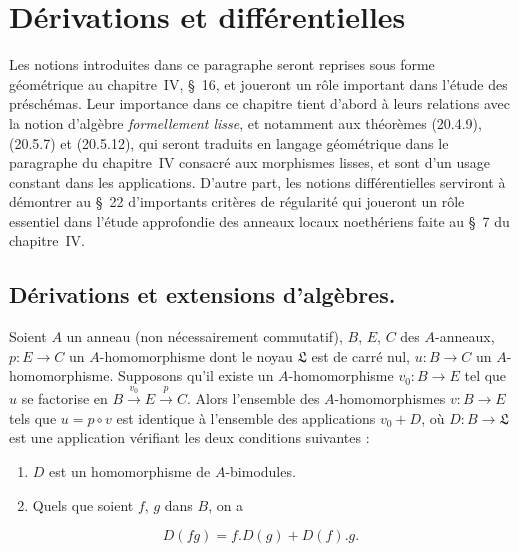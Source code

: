\section{Dérivations et différentielles}
\label{section:0.20-fr}
\label{0.20-fr}

Les notions introduites dans ce paragraphe seront reprises sous forme
géométrique au chapitre~IV, §~16, et joueront un rôle important dans l'étude
des préschémas. Leur importance dans ce chapitre tient d'abord à leurs
relations avec la notion d'algèbre \emph{formellement lisse}, et notamment aux
théorèmes (20.4.9), (20.5.7) et (20.5.12), qui seront traduits en langage
géométrique dans le paragraphe du chapitre~IV consacré aux morphismes lisses,
et sont d'un usage constant dans les applications. D'autre part, les notions
différentielles serviront à démontrer au §~22 d'importants critères de
régularité qui joueront un rôle essentiel dans l'étude approfondie des anneaux
locaux noethériens faite au §~7 du chapitre~IV.

\subsection{Dérivations et extensions d'algèbres.}
\label{subsection:0.20.1-fr}

\begin{proposition}[20.1.1]
\label{0.20.1.1-fr}
Soient $A$ un anneau \textup{(non nécessairement commutatif)}, $B$, $E$, $C$ des
$A$-anneaux, $p:E\to C$ un $A$-homomorphisme dont le noyau $\mathfrak{L}$
est de carré nul, $u:B\to C$ un $A$-homomorphisme. Supposons qu'il existe
un $A$-homomorphisme $v_0:B\to E$ tel que $u$ se factorise en
$B\xrightarrow{v_0}E\xrightarrow{p}C$. Alors l'ensemble des
$A$-homomorphismes $v:B\to E$ tels que $u=p\circ v$ est identique à
l'ensemble des applications $v_0+D$, où $D:B\to\mathfrak{L}$ est une
application vérifiant les deux conditions suivantes :
\begin{enumerate}
  \item[\rm(i)] $D$ est un homomorphisme de $A$-bimodules.
  \item[\rm(ii)] Quels que soient $f$, $g$ dans $B$, on a
\end{enumerate}
\begin{equation}
\tag{20.1.1.1}
\label{0.20.1.1.1-fr}
  D(fg)=f.D(g)+D(f).g.
\end{equation}
\end{proposition}

